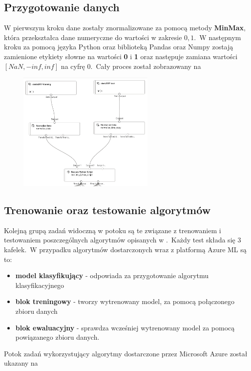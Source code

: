 \subsection{Przygotowanie danych}
W pierwszym kroku dane zostały znormalizowane za pomocą metody \textbf{MinMax}, która przekształca dane numeryczne do wartości w zakresie ${0, 1}$.\ W następnym kroku za pomocą języka Python oraz biblioteką Pandas oraz Numpy zostają zamienione etykiety słowne na wartości \textbf{0} i \textbf{1} oraz następuje zamiana wartości $[NaN, -inf, inf]$ na cyfrę $0$.\ Cały proces został zobrazowany na 

\begin{figure}[H]
    \centering
    \includegraphics[width=0.6\textwidth]{images/norm}
    \label{fig:norm}
\end{figure}

\vfill
\pagebreak

\subsection{Trenowanie oraz testowanie algorytmów}
Kolejną grupą zadań widoczną w potoku są te związane z trenowaniem i testowaniem poszczególnych algorytmów opisanych w .\ Każdy test składa się 3 kafelek.\ W przypadku algorytmów dostarczonych wraz z platformą Azure ML są to:
\begin{itemize}
    \item \textbf{model klasyfikujący} - odpowiada za przygotowanie algorytmu klasyfikacyjnego
    \item \textbf{blok treningowy} - tworzy wytrenowany model, za pomocą połączonego zbioru danych
    \item \textbf{blok ewaluacyjny} - sprawdza wcześniej wytrenowany model za pomocą powiązanego zbioru danych.
\end{itemize}
Potok zadań wykorzystujący algorytmy dostarczone przez Microsoft Azure został ukazany na 


